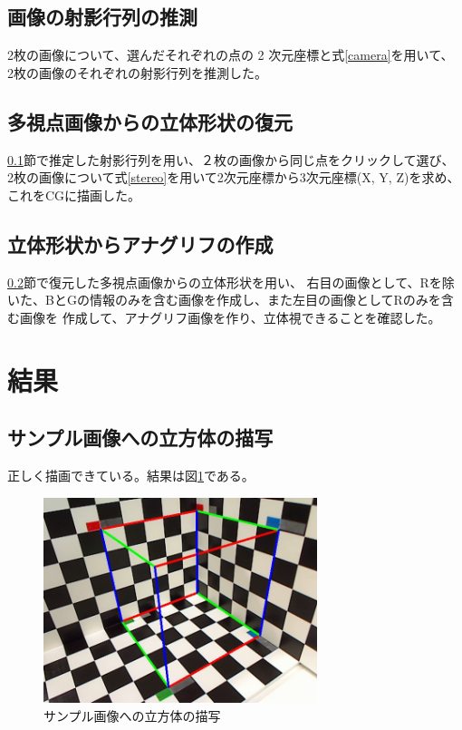\documentclass[11pt,a4j]{jsarticle}
\makeatletter
\newcommand{\figcaption}[1]{\def\@captype{figure}\caption{#1}}
\makeatother
\begin{document}
\subsection{画像の射影行列の推測}
\label{sub:画像の射影行列の推測}
2枚の画像について、選んだそれぞれの点の 2 次元座標と式\ref{camera}を用いて、
2枚の画像のそれぞれの射影行列を推測した。

\subsection{多視点画像からの立体形状の復元}
\label{sub:多視点画像からの立体形状の復元}
\ref{sub:画像の射影行列の推測}節で推定した射影行列を用い、２枚の画像から同じ点をクリックして選び、
2枚の画像について式\ref{stereo}を用いて2次元座標から3次元座標(X, Y, Z)を求め、これをCGに描画した。


\subsection{立体形状からアナグリフの作成}
\label{sub:立体形状からアナグリフの作成}

\ref{sub:多視点画像からの立体形状の復元}節で復元した多視点画像からの立体形状を用い、
右目の画像として、Rを除いた、BとGの情報のみを含む画像を作成し、また左目の画像としてRのみを含む画像を
作成して、アナグリフ画像を作り、立体視できることを確認した。

\section{結果}
\label{sec:結果}

\subsection{サンプル画像への立方体の描写}
\label{sub:result_box}

正しく描画できている。結果は図\ref{fig:サンプル画像への立方体の描写の写真}である。

\begin{figure}[H]
  \centering
  \includegraphics[height=60mm,bb=0 0 640 480]{image/task0.jpg}
  \figcaption{サンプル画像への立方体の描写}
  \label{fig:サンプル画像への立方体の描写の写真}
\end{figure}
\end{document}
